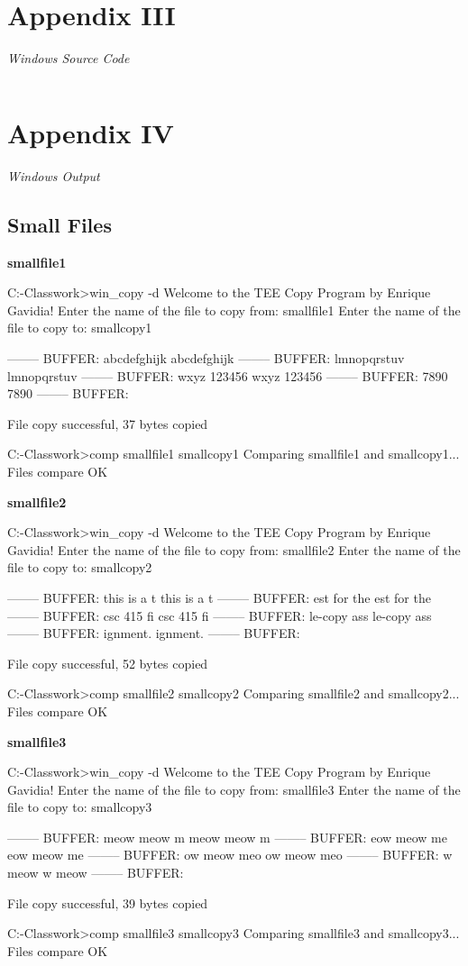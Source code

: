 \documentclass[12pt]{article}
\newcommand {\includesource}[2] {\inputminted[linenos, fontsize=\scriptsize, frame=lines]{#1}{#2}}
\newcommand {\append}[2] {\section*{Appendix #1} \textsl{\large #2}}
\newcommand {\filename}[1] {\flushleft \textbf{#1}}
\begin{document}
\append{III} {Windows Source Code}
\includesource{c}{win_copy.c}


\append{IV} {Windows Output}
\subsection*{Small Files}

\filename{smallfile1}
\begin{shelloutput}
C:\Users\Enrique\School\OS-Classwork>win_copy -d
Welcome to the TEE Copy Program by Enrique Gavidia!
Enter the name of the file to copy from:
smallfile1
Enter the name of the file to copy to:
smallcopy1

--------
BUFFER: abcdefghijk
abcdefghijk
--------
BUFFER: lmnopqrstuv
lmnopqrstuv
--------
BUFFER: wxyz
123456
wxyz
123456
--------
BUFFER: 7890
7890
--------
BUFFER:

File copy successful, 37 bytes copied

C:\Users\Enrique\School\OS-Classwork>comp smallfile1 smallcopy1
Comparing smallfile1 and smallcopy1...
Files compare OK

\end{shelloutput}



\filename{smallfile2}
\begin{shelloutput}
C:\Users\Enrique\School\OS-Classwork>win_copy -d
Welcome to the TEE Copy Program by Enrique Gavidia!
Enter the name of the file to copy from:
smallfile2
Enter the name of the file to copy to:
smallcopy2

--------
BUFFER: this is a t
this is a t
--------
BUFFER: est for the
est for the
--------
BUFFER:  csc 415 fi
 csc 415 fi
--------
BUFFER: le-copy ass
le-copy ass
--------
BUFFER: ignment.
ignment.
--------
BUFFER:

File copy successful, 52 bytes copied

C:\Users\Enrique\School\OS-Classwork>comp smallfile2 smallcopy2
Comparing smallfile2 and smallcopy2...
Files compare OK
\end{shelloutput}


\filename{smallfile3}
\begin{shelloutput}
C:\Users\Enrique\School\OS-Classwork>win_copy -d
Welcome to the TEE Copy Program by Enrique Gavidia!
Enter the name of the file to copy from:
smallfile3
Enter the name of the file to copy to:
smallcopy3

--------
BUFFER: meow meow m
meow meow m
--------
BUFFER: eow meow me
eow meow me
--------
BUFFER: ow meow meo
ow meow meo
--------
BUFFER: w meow
w meow
--------
BUFFER:

File copy successful, 39 bytes copied

C:\Users\Enrique\School\OS-Classwork>comp smallfile3 smallcopy3
Comparing smallfile3 and smallcopy3...
Files compare OK
\end{shelloutput}
\end{document}
